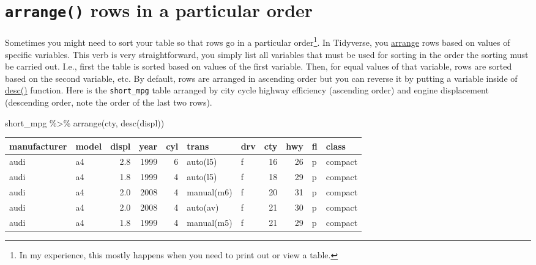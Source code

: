 \documentclass[
]{book}
\newenvironment{Shaded}{\begin{snugshade}}{\end{snugshade}}
\newcommand{\FunctionTok}[1]{\textcolor[rgb]{0.00,0.00,0.00}{#1}}
\newcommand{\NormalTok}[1]{#1}
\newcommand{\SpecialCharTok}[1]{\textcolor[rgb]{0.00,0.00,0.00}{#1}}
\begin{document}
\hypertarget{arrange-rows-in-a-particular-order}{%
\section{\texorpdfstring{\texttt{arrange()} rows in a particular order}{arrange() rows in a particular order}}\label{arrange-rows-in-a-particular-order}}

Sometimes you might need to sort your table so that rows go in a particular order\footnote{In my experience, this mostly happens when you need to print out or view a table.}. In Tidyverse, you \href{https://dplyr.tidyverse.org/reference/arrange.html}{arrange} rows based on values of specific variables. This verb is very straightforward, you simply list all variables that must be used for sorting in the order the sorting must be carried out. I.e., first the table is sorted based on values of the first variable. Then, for equal values of that variable, rows are sorted based on the second variable, etc. By default, rows are arranged in ascending order but you can reverse it by putting a variable inside of \href{https://dplyr.tidyverse.org/reference/desc.html}{desc()} function. Here is the \texttt{short\_mpg} table arranged by city cycle highway efficiency (ascending order) and engine displacement (descending order, note the order of the last two rows).

\begin{Shaded}
\begin{Highlighting}[]
\NormalTok{short\_mpg }\SpecialCharTok{\%\textgreater{}\%}
  \FunctionTok{arrange}\NormalTok{(cty, }\FunctionTok{desc}\NormalTok{(displ)) }
\end{Highlighting}
\end{Shaded}

\begin{tabular}{l|l|r|r|r|l|l|r|r|l|l}
\hline
manufacturer & model & displ & year & cyl & trans & drv & cty & hwy & fl & class\\
\hline
audi & a4 & 2.8 & 1999 & 6 & auto(l5) & f & 16 & 26 & p & compact\\
\hline
audi & a4 & 1.8 & 1999 & 4 & auto(l5) & f & 18 & 29 & p & compact\\
\hline
audi & a4 & 2.0 & 2008 & 4 & manual(m6) & f & 20 & 31 & p & compact\\
\hline
audi & a4 & 2.0 & 2008 & 4 & auto(av) & f & 21 & 30 & p & compact\\
\hline
audi & a4 & 1.8 & 1999 & 4 & manual(m5) & f & 21 & 29 & p & compact\\
\hline
\end{tabular}
\end{document}
